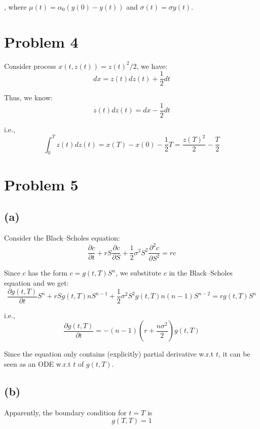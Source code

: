 \documentclass{article}
\begin{document}
, where \(\mu(t) = \alpha_0 (y(0) - y(t))\) and
\(\sigma(t) = \sigma y(t)\).

\section{Problem 4}\label{problem-4}

Consider process \(x(t,z(t)) = z(t)^2 / 2\), we have:
\begin{equation}
  dx = z(t)dz(t) + \frac{1}{2} dt
\end{equation}

Thus, we know: \begin{equation}
  z(t)dz(t) = dx - \frac{1}{2}dt
\end{equation}

i.e.,
  \begin{equation}
  \int_{0}^{T} z(t)dz(t) = x(T) - x(0) - \frac{1}{2} T = \frac{z(T)^2}{2} - \frac{T}{2}    
  \end{equation}


\section{Problem 5}\label{problem-5}

\subsection{(a)}\label{a}

Consider the Black–Scholes equation:
\[\frac{\partial c}{\partial t} + r S \frac{\partial c}{\partial S} + \frac{1}{2} \sigma^2 S^2 \frac{\partial^2 c}{\partial S^2} = rc\]

Since \(c\) has the form \(c = g(t, T)S^n\), we substitute \(c\) in the
Black–Scholes equation and we get:
\[\frac{\partial g(t,T)}{\partial t} S^n + r S g(t, T) n S^{n-1} + \frac{1}{2} \sigma^2 S^2 g(t, T) n(n-1) S^{n-2} = r g(t,T) S^n
\]

i.e., \[
\frac{\partial g(t,T)}{\partial t} = -(n-1)\left( r + \frac{n\sigma^2}{2}\right)g(t,T)
\]

Since the equation only contains (explicitly) partial derivative w.r.t
\(t\), it can be seen as an ODE w.r.t \(t\) of \(g(t,T)\).

\subsection{(b)}\label{b}

Apparently, the boundary condition for \(t=T\) is \[g(T,T) = 1\]
\end{document}
